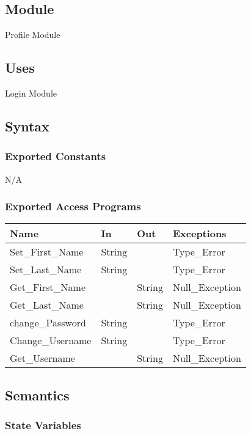 \documentclass[12pt, titlepage]{article}
\begin{document}
\subsection{Module}
Profile Module
\subsection{Uses}
Login Module 
\subsection{Syntax}

\subsubsection{Exported Constants}
N/A

\subsubsection{Exported Access Programs}

\begin{center}
\begin{tabular}{p{4cm} p{4cm} p{4cm} p{4cm}}
\hline
\textbf{Name} & \textbf{In} & \textbf{Out} & \textbf{Exceptions} \\
\hline
Set\_First\_Name & String &  & Type\_Error \\
\hline
Set\_Last\_Name & String &  &  Type\_Error\\
\hline
Get\_First\_Name &  & String & Null\_Exception \\
\hline
Get\_Last\_Name &  & String & Null\_Exception \\
\hline
change\_Password & String &  & Type\_Error \\
\hline
Change\_Username & String &  &  Type\_Error\\
\hline
Get\_Username &  & String & Null\_Exception\\
\hline
\end{tabular}
\end{center}

\subsection{Semantics}

\subsubsection{State Variables}
\end{document}
